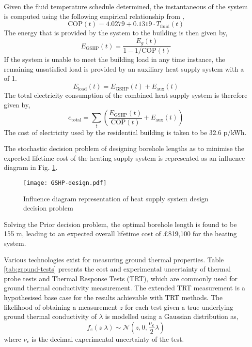 Given the fluid temperature schedule determined, the instantaneous  of the  system is computed using the following empirical relationship from \citep{kensa2014HowCOPVaries},
\begin{equation}
    \text{COP}(t) = 4.0279 +0.1319 \cdot T_{\text{fluid}}(t)
\end{equation}
The energy that is provided by the  system to the building is then given by,
\begin{equation}
    E_{\text{GSHP}}(t) = \frac{E_g(t)}{1-1/\text{COP}(t)}
\end{equation}
If the  system is unable to meet the building load in any time instance, the remaining unsatisfied load is provided by an auxiliary heat supply system with a  of 1.
\begin{equation}
    E_{\text{load}}(t) = E_{\text{GSHP}}(t) + E_{\text{aux}}(t)
\end{equation}
The total electricity consumption of the combined heat supply system is therefore given by,
\begin{equation}
    e_{\text{total}} = \sum_t \left( \frac{E_{\text{GSHP}}(t)}{\text{COP}(t)} + E_{\text{aux}}(t) \right)
\end{equation}
The cost of electricity used by the residential building is taken to be 32.6 p/kWh.

The stochastic decision problem of designing borehole lengths as to minimise the expected lifetime cost of the heating supply system is represented as an influence diagram in Fig. \ref{fig:ID-GSHP-design}.\\

\begin{figure}[h]
    \centering
    \texttt{[image: GSHP-design.pdf]}
    \vspace{4pt}
    \caption{Influence diagram representation of  heat supply system design decision problem}
    \label{fig:ID-GSHP-design}
\end{figure}

Solving the Prior decision problem, the optimal borehole length is found to be 155 m, leading to an expected overall lifetime cost of £819,100 for the heating system.

Various technologies exist for measuring ground thermal properties. Table \ref{tab:ground-tests} presents the cost and experimental uncertainty of thermal probe tests and Thermal Response Tests (TRT),  which are commonly used for ground thermal conductivity measurement. The extended TRT measurement is a hypothesised base case for the results achievable with TRT methods. The likelihood of obtaining a measurement $z$ for each test given a true underlying ground thermal conductivity of $\lambda$ is modelled using a Gaussian distribution as,
\begin{equation}
    f_e(z|\lambda) \sim \mathcal{N} \left( z,0,\frac{\nu_e}{2} \lambda \right)
\end{equation}
where $\nu_e$ is the decimal experimental uncertainty of the test.

